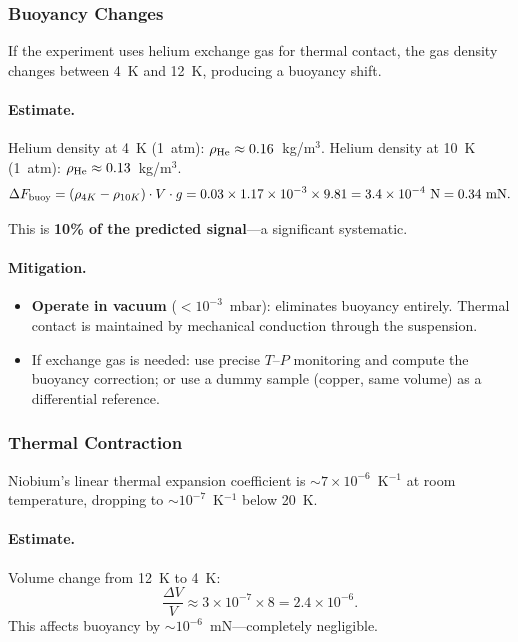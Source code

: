 \documentclass[12pt,a4paper]{article}
\theoremstyle{definition}
\theoremstyle{remark}
\begin{document}
\subsubsection{Buoyancy Changes}

If the experiment uses helium exchange gas for thermal contact, the gas density
changes between 4~K and 12~K, producing a buoyancy shift.

\paragraph{Estimate.}
Helium density at 4~K (1~atm): $\rho_{\rm He} \approx 0.16$~kg/m$^3$.
Helium density at 10~K (1~atm): $\rho_{\rm He} \approx 0.13$~kg/m$^3$.
\begin{equation}
\Delta F_{\rm buoy} = (\rho_{4K} - \rho_{10K}) \cdot V \cdot g
= 0.03 \times 1.17 \times 10^{-3} \times 9.81 = 3.4 \times 10^{-4}~\text{N}
= 0.34~\text{mN}.
\end{equation}

This is \textbf{10\% of the predicted signal}---a significant systematic.

\paragraph{Mitigation.}
\begin{itemize}
\item \textbf{Operate in vacuum} ($< 10^{-3}$~mbar): eliminates buoyancy entirely.
Thermal contact is maintained by mechanical conduction through the suspension.
\item If exchange gas is needed: use precise $T$--$P$ monitoring and compute the
buoyancy correction; or use a dummy sample (copper, same volume) as a
differential reference.
\end{itemize}

\subsubsection{Thermal Contraction}

Niobium's linear thermal expansion coefficient is $\sim 7 \times 10^{-6}$~K$^{-1}$
at room temperature, dropping to $\sim 10^{-7}$~K$^{-1}$ below 20~K.

\paragraph{Estimate.}
Volume change from 12~K to 4~K:
\begin{equation}
\frac{\Delta V}{V} \approx 3 \times 10^{-7} \times 8 = 2.4 \times 10^{-6}.
\end{equation}
This affects buoyancy by $\sim 10^{-6}$~mN---completely negligible.
\end{document}
